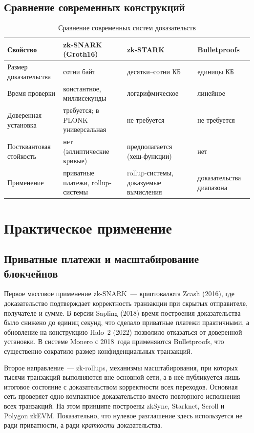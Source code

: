 \documentclass[14pt,a4paper]{extarticle}
\begin{document}
\subsection{Сравнение современных конструкций}

\begin{table}[H]
\caption{Сравнение современных систем доказательств}
\label{tab:modern}
\centering
\small
\setlength{\tabcolsep}{4pt}
\begin{tabularx}{\textwidth}{>{\raggedright\arraybackslash}p{3.4cm}XXX}
\toprule
Свойство & zk-SNARK (Groth16) & zk-STARK & Bulletproofs \\
\midrule
Размер доказательства & сотни байт & десятки--сотни КБ & единицы КБ \\
Время проверки & константное, миллисекунды & логарифмическое & линейное \\
Доверенная установка & требуется; в PLONK универсальная & не требуется & не требуется \\
Постквантовая стойкость & нет (эллиптические кривые) & предполагается (хеш-функции) & нет \\
Применение & приватные платежи, rollup-системы & rollup-системы, доказуемые вычисления & доказательства диапазона \\
\bottomrule
\end{tabularx}
\end{table}

\section{Практическое применение}

\subsection{Приватные платежи и масштабирование блокчейнов}

Первое массовое применение zk-SNARK~--- криптовалюта Zcash (2016), где доказательство
подтверждает корректность транзакции при скрытых отправителе, получателе и сумме.
В версии Sapling (2018) время построения доказательства было снижено до единиц секунд,
что сделало приватные платежи практичными, а обновление на конструкцию Halo~2 (2022)
позволило отказаться от доверенной установки. В системе Monero с 2018~года применяются
Bulletproofs, что существенно сократило размер конфиденциальных транзакций.

Второе направление~--- zk-rollups, механизмы масштабирования, при которых тысячи
транзакций выполняются вне основной сети, а в неё публикуется лишь итоговое состояние с
доказательством корректности всех переходов. Основная сеть проверяет одно компактное
доказательство вместо повторного исполнения всех транзакций. На этом принципе построены
zkSync, Starknet, Scroll и Polygon zkEVM. Показательно, что нулевое разглашение здесь
используется не ради приватности, а ради \emph{краткости} доказательства.
\end{document}
